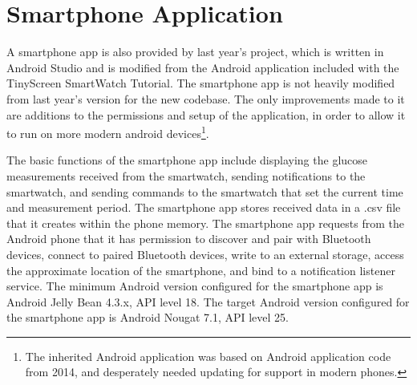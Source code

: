 \section{Smartphone Application}
A smartphone app is also provided by last year's project, which is written in Android Studio and is modified from the Android application included with the TinyScreen SmartWatch Tutorial. The smartphone app is not heavily modified from last year's version for the new codebase. The only improvements made to it are additions to the permissions and setup of the application, in order to allow it to run on more modern android devices\footnote{The inherited Android application was based on Android application code from 2014, and desperately needed updating for support in modern phones.}.

The basic functions of the smartphone app include displaying the glucose measurements received from the smartwatch, sending notifications to the smartwatch, and sending commands to the smartwatch that set the current time and measurement period. The smartphone app stores received data in a .csv file that it creates within the phone memory. The smartphone app requests from the Android phone that it has permission to discover and pair with Bluetooth devices, connect to paired Bluetooth devices, write to an external storage, access the approximate location of the smartphone, and bind to a notification listener service. The minimum Android version configured for the smartphone app is Android Jelly Bean 4.3.x, API level 18. The target Android version configured for the smartphone app is Android Nougat 7.1, API level 25.
